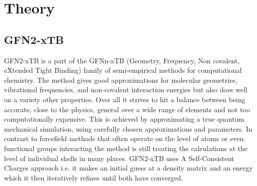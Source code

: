 \chapter{Theory}
\section{GFN2-xTB}
GFN2-xTB is a part of the GFNn-xTB (Geometry, Frequency, Non covalent, eXtended Tight Binding) family of semi-empirical methods for computational chemistry. 
The method gives good approximations for molecular geometries, vibrational frequencies, and non-covalent interaction energies but also does well on a variety other properties. 
Over all it strives to hit a balance between being accurate, close to the physics, general over a wide range of elements and not too computationally expensive.
This is achieved by approximating a true quantum mechanical simulation, using carefully chosen approximations and parameters. 
In contrast to forcefield methods that often operate on the level of atoms or even functional groups interacting the method is still treating the calculations at the level of individual shells in many places. 
GFN2-xTB uses A Self-Consistent Charges approach i.e. it makes an initial guess at a density matrix and an energy which it then iteratively refines until both have converged. 

